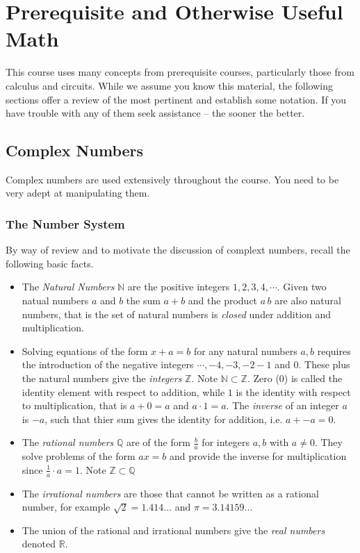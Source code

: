 \chapter{Prerequisite and Otherwise Useful Math}

This course uses many concepts from prerequisite courses, particularly those from calculus and circuits. While we assume you know this material, the following sections offer a review of the most pertinent and establish some notation. If you have trouble with any of them seek assistance -- the sooner the better.

\section{Complex Numbers}

Complex numbers are used extensively throughout the course. You need to be very adept at manipulating them.

\subsection*{The Number System}

By way of review and to motivate the discussion of complext numbers, recall the following basic facts.

\begin{itemize}
\item The \emph{Natural Numbers} $\mathbb{N}$ are the positive integers $1,2,3,4,\cdots$. Given two natual numbers $a$ and $b$ the sum $a+b$ and the product $a\,b$ are also natural numbers, that is the set of natural numbers is \emph{closed} under addition and multiplication.

\item Solving equations of the form $x + a = b$ for any natural numbers $a,b$ requires the introduction of the negative integers $\cdots, -4, -3, -2 -1$ and $0$. These plus the natural numbers give the \emph{integers}  $\mathbb{Z}$. Note $\mathbb{N} \subset \mathbb{Z}$. Zero ($0$) is called the identity element with respect to addition, while $1$ is the identity with respect to multiplication, that is $a+0 = a$ and $ a \cdot 1 = a$. The \emph{inverse} of an integer $a$ is $-a$, such that thier sum gives the identity for addition, i.e. $a + -a = 0$.

\item The \emph{rational numbers} $\mathbb{Q}$ are of the form $\frac{b}{a}$ for integers $a,b$ with $a \neq 0$. They solve problems of the form $ax=b$ and provide the inverse for multiplication since $\frac{1}{a} \cdot a = 1$. Note $\mathbb{Z} \subset \mathbb{Q}$

\item The \emph{irrational numbers} are those that cannot be written as a rational number, for example $\sqrt{2} = 1.414\ldots$ and $\pi = 3.14159\ldots$

\item The union of the rational and irrational numbers give the \emph{real numbers} denoted $\mathbb{R}$.
\end{itemize}

